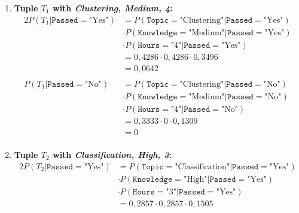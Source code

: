 \documentclass[
english,
smallborders
]{i6prcsht}
\newcommand{\Likelihood}[4]{P(\texttt{#1}=\text{"#2"} | \texttt{#3}=\text{"#4"})}
\newcommand{\LikelihoodTuple}[3]{P(#1 | \texttt{#2}=\text{"#3"})}
\begin{document}
\begin{solution}
\begin{enumerate}
		      \begin{enumerate}
			      \item \textbf{Tuple $T_1$ with \textit{Clustering, Medium, 4}:}
			            \begin{alignat*}{2}
				            \LikelihoodTuple{T_1}{Passed}{Yes} & =  \Likelihood{Topic}{Clustering}{Passed}{Yes}    \\
				                                               & \cdot \Likelihood{Knowledge}{Medium}{Passed}{Yes} \\
				                                               & \cdot \Likelihood{Hours}{4}{Passed}{Yes}          \\
				                                               & = 0,4286 \cdot 0,4286 \cdot 0,3496                \\
				                                               & = 0,0642                                          \\
				                                               &                                                   \\
				            \LikelihoodTuple{T_1}{Passed}{No}  & =  \Likelihood{Topic}{Clustering}{Passed}{No}     \\
				                                               & \cdot \Likelihood{Knowledge}{Medium}{Passed}{No}  \\
				                                               & \cdot \Likelihood{Hours}{4}{Passed}{No}           \\
				                                               & =  0,3333 \cdot 0 \cdot 0,1309                    \\
				                                               & = 0                                               \\
			            \end{alignat*}
			      \item \textbf{Tuple $T_2$ with \textit{Classification, High, 3}:}
			            \begin{alignat*}{2}
				            \LikelihoodTuple{T_2}{Passed}{Yes} & =  \Likelihood{Topic}{Classification}{Passed}{Yes} \\
				                                               & \cdot \Likelihood{Knowledge}{High}{Passed}{Yes}    \\
				                                               & \cdot \Likelihood{Hours}{3}{Passed}{Yes}           \\
				                                               & =  0,2857 \cdot 0,2857 \cdot 0,1505                \\

\end{alignat*}
\end{enumerate}
\end{enumerate}
\end{solution}
\end{document}
